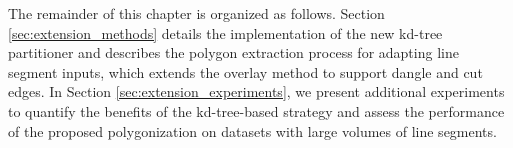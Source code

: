 The remainder of this chapter is organized as follows. Section \ref{sec:extension_methods} details the implementation of the new kd-tree partitioner and describes the polygon extraction process for adapting line segment inputs, which extends the overlay method to support dangle and cut edges. In Section \ref{sec:extension_experiments}, we present additional experiments to quantify the benefits of the kd-tree-based strategy and assess the performance of the proposed polygonization on datasets with large volumes of line segments.
